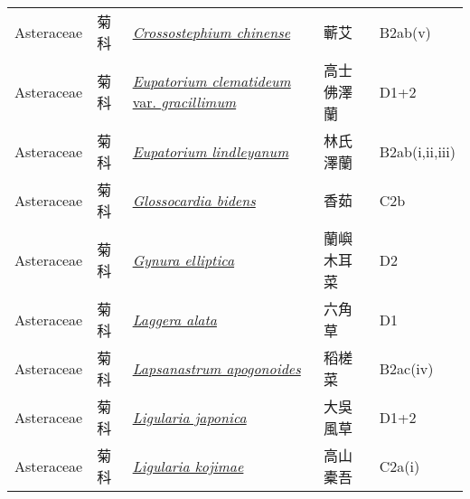 {\begin{longtable}{L{2.5cm}L{2cm}L{5cm}L{2.5cm}L{3cm}}
    Asteraceae & 菊科 & \href{http://www.theplantlist.org/tpl1.1/search?q=Crossostephium+chinense}{\textit{Crossostephium chinense} } & 蘄艾 & B2ab(v)    \\
    Asteraceae & 菊科 & \href{http://www.theplantlist.org/tpl1.1/search?q=Eupatorium+clematideum+var.+gracillimum}{\textit{Eupatorium clematideum} var. \textit{gracillimum} } & 高士佛澤蘭 & D1+2    \\
    Asteraceae & 菊科 & \href{http://www.theplantlist.org/tpl1.1/search?q=Eupatorium+lindleyanum}{\textit{Eupatorium lindleyanum} } & 林氏澤蘭 & B2ab(i,ii,iii)    \\
    Asteraceae & 菊科 & \href{http://www.theplantlist.org/tpl1.1/search?q=Glossocardia+bidens}{\textit{Glossocardia bidens} } & 香茹 & C2b    \\
    Asteraceae & 菊科 & \href{http://www.theplantlist.org/tpl1.1/search?q=Gynura+elliptica}{\textit{Gynura elliptica} } & 蘭嶼木耳菜 & D2    \\
    Asteraceae & 菊科 & \href{http://www.theplantlist.org/tpl1.1/search?q=Laggera+alata}{\textit{Laggera alata} } & 六角草 & D1    \\
    Asteraceae & 菊科 & \href{http://www.theplantlist.org/tpl1.1/search?q=Lapsanastrum+apogonoides}{\textit{Lapsanastrum apogonoides} } & 稻槎菜 & B2ac(iv)    \\
    Asteraceae & 菊科 & \href{http://www.theplantlist.org/tpl1.1/search?q=Ligularia+japonica}{\textit{Ligularia japonica} } & 大吳風草 & D1+2    \\
    Asteraceae & 菊科 & \href{http://www.theplantlist.org/tpl1.1/search?q=Ligularia+kojimae}{\textit{Ligularia kojimae} } & 高山橐吾 & C2a(i)    \\

\end{longtable}}
